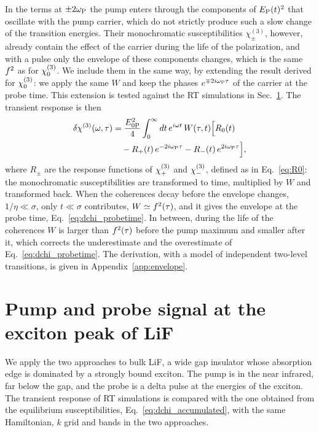 \documentclass[aps,prb,reprint,superscriptaddress,amsmath,amssymb]{revtex4-2}
\begin{document}
In the terms at $\pm2\omega_{\mathrm{P}}$ the pump enters through the components of $E_{\mathrm{P}}(t)^2$ that oscillate with the pump carrier,
which do not strictly produce such a slow change of the transition energies. Their monochromatic susceptibilities
$\chi^{(3)}_\pm$, however, already contain the effect of the carrier during the life of the polarization, and with a
pulse only the envelope of these components changes, which is the same $f^2$ as for $\chi^{(3)}_{0}$. We include them in the
same way, by extending the result derived for $\chi^{(3)}_{0}$: we apply the same $W$ and keep the phases $e^{\mp2i\omega_{\mathrm{P}}\tau}$ of
the carrier at the probe time. This extension is tested against the RT simulations in Sec.~\ref{sec:lif}. The
transient response is then
\begin{align}
\delta\chi^{(3)}(\omega,\tau) &= \frac{E_{0\mathrm{P}}^2}{4}\int_0^\infty dt\,e^{i\omega t}\,W(\tau,t)\Big[R_0(t) \nonumber\\
&\quad - R_+(t)\,e^{-2i\omega_{\mathrm{P}}\tau} - R_-(t)\,e^{2i\omega_{\mathrm{P}}\tau}\Big] ,
\label{eq:dchi_accumulated}
\end{align}
where $R_\pm$ are the response functions of $\chi^{(3)}_{+}$ and $\chi^{(3)}_{-}$, defined as in Eq.~\eqref{eq:R0}: the monochromatic
susceptibilities are transformed to time, multiplied by $W$ and transformed back. When the coherences decay before the envelope
changes, $1/\eta\ll\sigma$, only $t\ll\sigma$ contributes, $W\simeq f^2(\tau)$, and it gives the envelope at the
probe time, Eq.~\eqref{eq:dchi_probetime}. In between, during the life of the coherences $W$ is larger than
$f^2(\tau)$ before the pump maximum and smaller after it, which corrects the underestimate and the overestimate of
Eq.~\eqref{eq:dchi_probetime}. The derivation, with a model of independent two-level transitions, is given in
Appendix~\ref{app:envelope}.

\section{Pump and probe signal at the exciton peak of LiF}
\label{sec:lif}


We apply the two approaches to bulk LiF, a wide gap insulator whose absorption edge is dominated by a strongly bound
exciton. The pump is in the near infrared, far below the gap, and the probe is a delta pulse at the energies of the
exciton. The transient response of RT simulations is compared with the one obtained from the equilibrium
susceptibilities, Eq.~\eqref{eq:dchi_accumulated}, with the same Hamiltonian, $k$ grid and bands in the two approaches.
\end{document}
